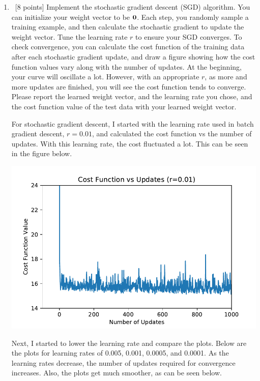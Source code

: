 \documentclass[12pt, fullpage,letterpaper]{article}
\begin{document}
\begin{enumerate}
\begin{enumerate}
 
		\item~[8 points] Implement the stochastic gradient descent (SGD) algorithm. You can initialize your weight vector to be ${\bf 0}$. Each step, you randomly sample a training example, and then calculate the stochastic gradient to update the weight vector.  Tune the learning rate $r$ to ensure your SGD converges. To check convergence, you can calculate the cost function of the training data after each stochastic gradient update, and draw a figure showing how the cost function values vary along with the number of updates. At the beginning, your curve will oscillate a lot. However, with an appropriate $r$, as more and more updates are finished, you will see the cost function tends to converge. Please report the learned weight vector, and the learning rate you chose, and the cost function value of the test data with your learned weight vector.   
		
		For stochastic gradient descent, I started with the learning rate used in batch gradient descent, $r=0.01$, and calculated the cost function vs the number of updates. With this learning rate, the cost fluctuated a lot. This can be seen in the figure below.
		
		\includegraphics{r01.pdf}
		
		Next, I started to lower the learning rate and compare the plots. Below are the plots for learning rates of 0.005, 0.001, 0.0005, and 0.0001. As the learning rates decrease, the number of updates required for convergence increases. Also, the plots get much smoother, as can be seen below. 
		

\end{enumerate}
\end{enumerate}
\end{document}
